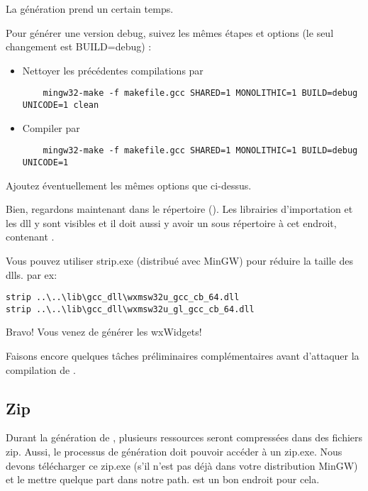
La génération prend un certain temps.

Pour générer une version debug, suivez les mêmes étapes et options (le seul changement est BUILD=debug) :

\begin{itemize}
\item Nettoyer les précédentes compilations par
	\begin{verbatim}
	mingw32-make -f makefile.gcc SHARED=1 MONOLITHIC=1 BUILD=debug UNICODE=1 clean
	\end{verbatim}
\item Compiler par
	\begin{verbatim}
	mingw32-make -f makefile.gcc SHARED=1 MONOLITHIC=1 BUILD=debug UNICODE=1
	\end{verbatim}
\end{itemize}

Ajoutez éventuellement les mêmes options que ci-dessus.

Bien, regardons maintenant dans le répertoire (). Les librairies d'importation et les dll y sont visibles et il doit aussi y avoir un sous répertoire  à cet endroit, contenant .

Vous pouvez utiliser strip.exe (distribué avec MinGW) pour réduire la taille des dlls.
par ex:
\begin{verbatim}
strip ..\..\lib\gcc_dll\wxmsw32u_gcc_cb_64.dll
strip ..\..\lib\gcc_dll\wxmsw32u_gl_gcc_cb_64.dll
\end{verbatim}

Bravo! Vous venez de générer les wxWidgets!

Faisons encore quelques tâches préliminaires complémentaires avant d'attaquer la compilation de \codeblocks.

\subsection{Zip}

Durant la génération de \codeblocks, plusieurs ressources seront compressées dans des fichiers zip. Aussi, le processus de génération doit pouvoir accéder à un zip.exe. Nous devons télécharger ce zip.exe (s'il n'est pas déjà dans votre distribution MinGW) et le mettre quelque part dans notre path.  est un bon endroit pour cela.

